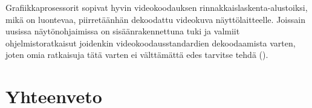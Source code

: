 Grafiikkaprosessorit sopivat hyvin videokoodauksen
rinnakkaislaskenta-alustoiksi, mikä on luontevaa, piirretäänhän dekoodattu
videokuva näyttölaitteelle. Joissain uusissa näytönohjaimissa on
sisäänrakennettuna tuki ja valmiit ohjelmistoratkaisut joidenkin videokoodausstandardien dekoodaamista
varten, joten omia ratkaisuja tätä varten ei välttämättä edes tarvitse tehdä (\citealt{nvidia}).

\section{Yhteenveto}
\label{chap:conclusion}

